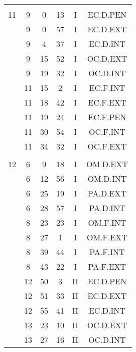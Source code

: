 \documentclass[12pt, a4paper]{article}
\begin{document}
\begin{multicols}{3}
{\begin{tabular}{c c c c c c}
	 	 	 	 & & & & & \\%
	 	 	 	11 & 9 & 0 & 13 & I & EC.D.PEN\\%
	 	 	 	 & 9 & 0 & 57 & I & EC.D.EXT\\%
	 	 	 	 & 9 & 4 & 37 & I & EC.D.INT\\%
	 	 	 	 & 9 & 15 & 52 & I & OC.D.EXT\\%
	 	 	 	 & 9 & 19 & 32 & I & OC.D.INT\\%
	 	 	 	 & 11 & 15 & 2 & I & EC.F.INT\\%
	 	 	 	 & 11 & 18 & 42 & I & EC.F.EXT\\%
	 	 	 	 & 11 & 19 & 24 & I & EC.F.PEN\\%
	 	 	 	 & 11 & 30 & 54 & I & OC.F.INT\\%
	 	 	 	 & 11 & 34 & 32 & I & OC.F.EXT\\%
	 	 	 	 & & & & & \\%
	 	 	 	12 & 6 & 9 & 18 & I & OM.D.EXT\\%
	 	 	 	 & 6 & 12 & 56 & I & OM.D.INT\\%
	 	 	 	 & 6 & 25 & 19 & I & PA.D.EXT\\%
	 	 	 	 & 6 & 28 & 57 & I & PA.D.INT\\%
	 	 	 	 & 8 & 23 & 23 & I & OM.F.INT\\%
	 	 	 	 & 8 & 27 & 1 & I & OM.F.EXT\\%
	 	 	 	 & 8 & 39 & 44 & I & PA.F.INT\\%
	 	 	 	 & 8 & 43 & 22 & I & PA.F.EXT\\%
	 	 	 	 & 12 & 50 & 3 & II & EC.D.PEN\\%
	 	 	 	 & 12 & 51 & 33 & II & EC.D.EXT\\%
	 	 	 	 & 12 & 55 & 41 & II & EC.D.INT\\%
	 	 	 	 & 13 & 23 & 10 & II & OC.D.EXT\\%
	 	 	 	 & 13 & 27 & 16 & II & OC.D.INT\\%
	 	 \end{tabular}
 	}
\end{multicols}
\end{document}
